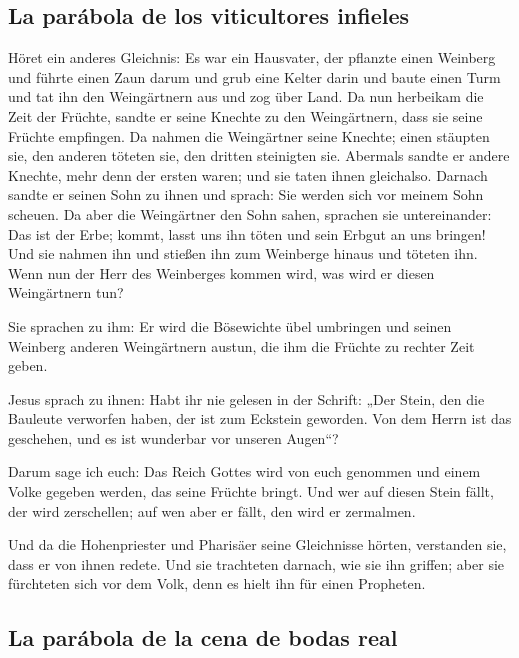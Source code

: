 \hypertarget{la-paruxe1bola-de-los-viticultores-infieles}{%
\subsection{La parábola de los viticultores
infieles}\label{la-paruxe1bola-de-los-viticultores-infieles}}

 Höret ein anderes Gleichnis: Es war ein Hausvater, der
pflanzte einen Weinberg und führte einen Zaun darum und grub eine Kelter
darin und baute einen Turm und tat ihn den Weingärtnern aus und zog über
Land.  Da nun herbeikam die Zeit der Früchte, sandte er
seine Knechte zu den Weingärtnern, dass sie seine Früchte empfingen.
 Da nahmen die Weingärtner seine Knechte; einen stäupten
sie, den anderen töteten sie, den dritten steinigten sie.
 Abermals sandte er andere Knechte, mehr denn der ersten
waren; und sie taten ihnen gleichalso.  Darnach sandte er
seinen Sohn zu ihnen und sprach: Sie werden sich vor meinem Sohn
scheuen.  Da aber die Weingärtner den Sohn sahen,
sprachen sie untereinander: Das ist der Erbe; kommt, lasst uns ihn töten
und sein Erbgut an uns bringen!  Und sie nahmen ihn und
stießen ihn zum Weinberge hinaus und töteten ihn.  Wenn
nun der Herr des Weinberges kommen wird, was wird er diesen Weingärtnern
tun?

 Sie sprachen zu ihm: Er wird die Bösewichte übel
umbringen und seinen Weinberg anderen Weingärtnern austun, die ihm die
Früchte zu rechter Zeit geben.

 Jesus sprach zu ihnen: Habt ihr nie gelesen in der
Schrift: „Der Stein, den die Bauleute verworfen haben, der ist zum
Eckstein geworden. Von dem Herrn ist das geschehen, und es ist wunderbar
vor unseren Augen``?

 Darum sage ich euch: Das Reich Gottes wird von euch
genommen und einem Volke gegeben werden, das seine Früchte bringt.
 Und wer auf diesen Stein fällt, der wird zerschellen;
auf wen aber er fällt, den wird er zermalmen.

 Und da die Hohenpriester und Pharisäer seine Gleichnisse
hörten, verstanden sie, dass er von ihnen redete.  Und
sie trachteten darnach, wie sie ihn griffen; aber sie fürchteten sich
vor dem Volk, denn es hielt ihn für einen Propheten.

\hypertarget{la-paruxe1bola-de-la-cena-de-bodas-real}{%
\subsection{La parábola de la cena de bodas
real}\label{la-paruxe1bola-de-la-cena-de-bodas-real}}

